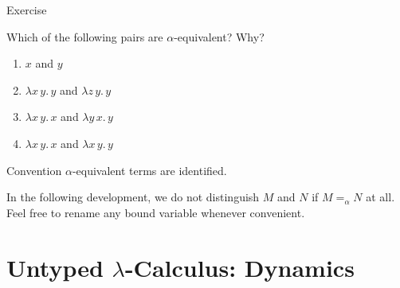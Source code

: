 \begin{frame}{Exercise}

Which of the following pairs are $\alpha$-equivalent? Why?
\begin{enumerate}
  \item $x$ and $y$
  \item $\lambda x\,y.\, y$ and $\lambda z\,y.\, y$
  \item $\lambda x\,y.\, x$ and $\lambda y\,x.\, y$
  \item $\lambda x\,y.\, x$ and $\lambda x\,y.\, y$
\end{enumerate}

\begin{block}{Convention}
  $\alpha$-equivalent terms are \alert{identified}. 
\end{block}

In the following development, we do not distinguish $M$ and $N$ if $M
=_\alpha N$ at all. Feel free to rename any bound variable whenever
convenient.

\end{frame}

\section{Untyped $\lambda$-Calculus: Dynamics}
%
%

